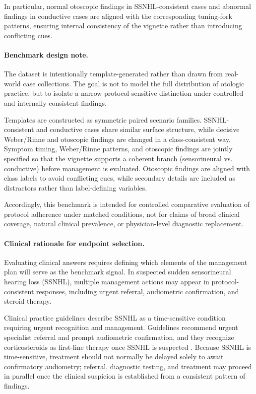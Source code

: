 \documentclass[twocolumn]{article}
\begin{document}
In particular, normal otoscopic findings in SSNHL-consistent cases and abnormal
findings in conductive cases are aligned with the corresponding tuning-fork
patterns, ensuring internal consistency of the vignette rather than introducing
conflicting cues.

\paragraph{Benchmark design note.}
The dataset is intentionally template-generated rather than drawn from
real-world case collections. The goal is not to model the full distribution of
otologic practice, but to isolate a narrow protocol-sensitive distinction under
controlled and internally consistent findings.

Templates are constructed as symmetric paired scenario families. SSNHL-consistent
and conductive cases share similar surface structure, while decisive
Weber/Rinne and otoscopic findings are changed in a class-consistent way.
Symptom timing, Weber/Rinne patterns, and otoscopic findings are jointly
specified so that the vignette supports a coherent branch (sensorineural vs.
conductive) before management is evaluated. Otoscopic findings are aligned with
class labels to avoid conflicting cues, while secondary details are included as
distractors rather than label-defining variables.

Accordingly, this benchmark is intended for controlled comparative evaluation of
protocol adherence under matched conditions, not for claims of broad clinical
coverage, natural clinical prevalence, or physician-level diagnostic
replacement.

\paragraph{Clinical rationale for endpoint selection.}
Evaluating clinical answers requires defining which elements of the management
plan will serve as the benchmark signal. In suspected sudden sensorineural
hearing loss (SSNHL), multiple management actions may appear in
protocol-consistent responses, including urgent referral, audiometric
confirmation, and steroid therapy.

Clinical practice guidelines describe SSNHL as a time-sensitive condition
requiring urgent recognition and management. Guidelines recommend urgent
specialist referral and prompt audiometric confirmation, and they recognize
corticosteroids as first-line therapy once SSNHL is suspected
\parencite{chandrasekhar2019ssnhl,nice2018hearingloss,
nice2019qualityhearingloss,leung2016ssnhlpcu}. Because SSNHL is time-sensitive,
treatment should not normally be delayed solely to await confirmatory
audiometry; referral, diagnostic testing, and treatment may proceed in parallel
once the clinical suspicion is established from a consistent pattern of
findings.
\end{document}
